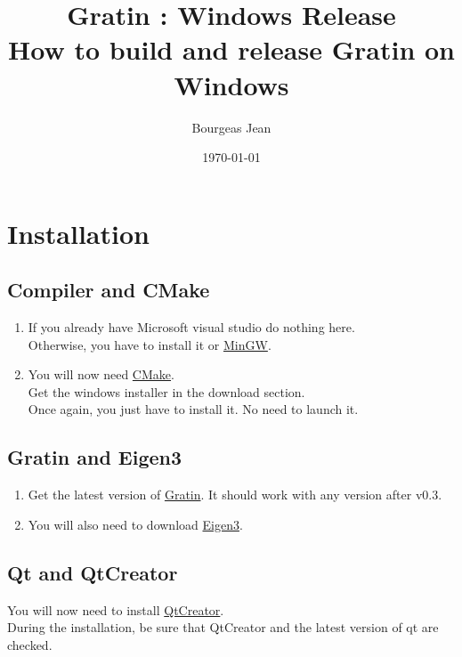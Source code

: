 \documentclass{beamer}
\title[Gratin : Windows Release]{Gratin : Windows Release\\How to build and release Gratin on Windows}
\author{Bourgeas Jean}
\institute{INRIA}
\date{\today}
\begin{document}
\begin{frame}
  \titlepage
\end{frame}

\section{Installation}
\subsection{Compiler and CMake}

\begin{frame}
  \begin{enumerate}
    \item If you already have Microsoft visual studio do nothing here.\\
Otherwise, you have to install it or \color{blue}\href{http://www.mingw.org/}{MinGW}\color{black}.
    \item You will now need \color{blue}\href{http://www.cmake.org/}{CMake}\color{black}.\\Get the windows installer in the download section.
\\Once again, you just have to install it. No need to launch it.
  \end{enumerate}
\end{frame}

\subsection{Gratin and Eigen3}
\begin{frame}
  \begin{enumerate}
    \item Get the latest version of \color{blue}\href{http://gratin.gforge.inria.fr/}{Gratin}\color{black}. It should work with any version after v0.3.
    \item You will also need to download \color{blue}\href{http://eigen.tuxfamily.org/index.php?title=Main_Page}{Eigen3}\color{black}.
  \end{enumerate}
\end{frame}

\subsection{Qt and QtCreator}
\begin{frame}
  You will now need to install \color{blue}\href{https://www.qt.io/download/}{QtCreator}\color{black}.\\
During the installation, be sure that QtCreator and the latest version of qt are checked.
\end{frame}
\end{document}
